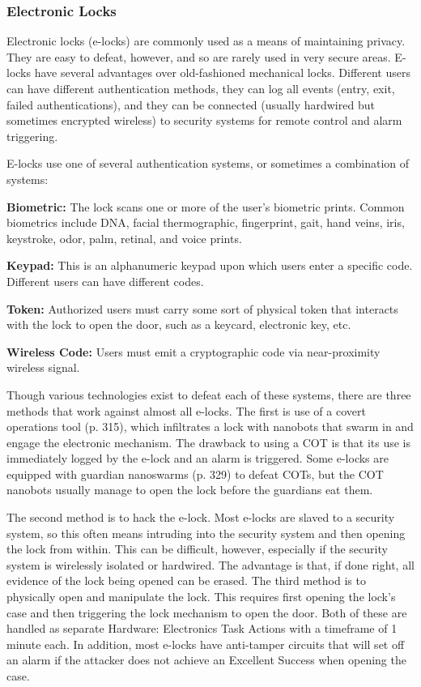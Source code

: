 \subsubsection{Electronic Locks} 

Electronic locks (e-locks) are commonly used as a means of maintaining privacy. They are easy to defeat, however, and so are rarely used in very secure areas. E-locks have several advantages over old-fashioned mechanical locks. Different users can have different authentication methods, they can log all events (entry, exit, failed authentications), and they can be connected (usually hardwired but sometimes encrypted wireless) to security systems for remote control and alarm triggering. 

E-locks use one of several authentication systems, or sometimes a combination of systems: 

\textbf{Biometric:} The lock scans one or more of the user's biometric prints. Common biometrics include DNA, facial thermographic, fingerprint, gait, hand veins, iris, keystroke, odor, palm, retinal, and voice prints. 

\textbf{Keypad:} This is an alphanumeric keypad upon which users enter a specific code. Different users can have different codes. 

\textbf{Token:} Authorized users must carry some sort of physical token that interacts with the lock to open the door, such as a keycard, electronic key, etc. 

\textbf{Wireless Code:} Users must emit a cryptographic code via near-proximity wireless signal. 

Though various technologies exist to defeat each of these systems, there are three methods that work against almost all e-locks. The first is use of a covert operations tool (p. 315), which infiltrates a lock with nanobots that swarm in and engage the electronic mechanism. The drawback to using a COT is that its use is immediately logged by the e-lock and an alarm is triggered. Some e-locks are equipped with guardian nanoswarms (p. 329) to defeat COTs, but the COT nanobots usually manage to open the lock before the guardians eat them. 

The second method is to hack the e-lock. Most e-locks are slaved to a security system, so this often means intruding into the security system and then opening the lock from within. This can be difficult, however, especially if the security system is wirelessly isolated or hardwired. The advantage is that, if done right, all evidence of the lock being opened can be erased. The third method is to physically open and manipulate the lock. This requires first opening the lock's case and then triggering the lock mechanism to open the door. Both of these are handled as separate Hardware: Electronics Task Actions with a timeframe of 1 minute each. In addition, most e-locks have anti-tamper circuits that will set off an alarm if the attacker does not achieve an Excellent Success when opening the case. 





